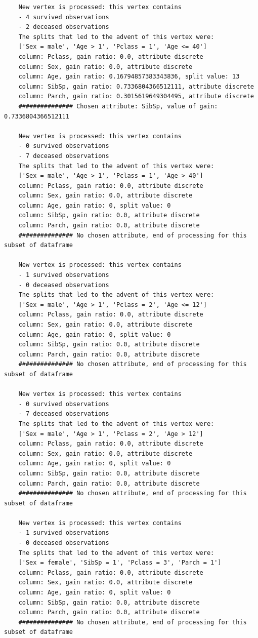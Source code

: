 \documentclass[12pt]{article}
\begin{document}
\begin{verbatim}
	New vertex is processed: this vertex contains
	- 4 survived observations
	- 2 deceased observations
	The splits that led to the advent of this vertex were:
	['Sex = male', 'Age > 1', 'Pclass = 1', 'Age <= 40']
	column: Pclass, gain ratio: 0.0, attribute discrete
	column: Sex, gain ratio: 0.0, attribute discrete
	column: Age, gain ratio: 0.16794857383343836, split value: 13
	column: SibSp, gain ratio: 0.7336804366512111, attribute discrete
	column: Parch, gain ratio: 0.3015619649304495, attribute discrete
	############### Chosen attribute: SibSp, value of gain: 0.7336804366512111
	
	New vertex is processed: this vertex contains
	- 0 survived observations
	- 7 deceased observations
	The splits that led to the advent of this vertex were:
	['Sex = male', 'Age > 1', 'Pclass = 1', 'Age > 40']
	column: Pclass, gain ratio: 0.0, attribute discrete
	column: Sex, gain ratio: 0.0, attribute discrete
	column: Age, gain ratio: 0, split value: 0
	column: SibSp, gain ratio: 0.0, attribute discrete
	column: Parch, gain ratio: 0.0, attribute discrete
	############### No chosen attribute, end of processing for this subset of dataframe
	
	New vertex is processed: this vertex contains
	- 1 survived observations
	- 0 deceased observations
	The splits that led to the advent of this vertex were:
	['Sex = male', 'Age > 1', 'Pclass = 2', 'Age <= 12']
	column: Pclass, gain ratio: 0.0, attribute discrete
	column: Sex, gain ratio: 0.0, attribute discrete
	column: Age, gain ratio: 0, split value: 0
	column: SibSp, gain ratio: 0.0, attribute discrete
	column: Parch, gain ratio: 0.0, attribute discrete
	############### No chosen attribute, end of processing for this subset of dataframe
	
	New vertex is processed: this vertex contains
	- 0 survived observations
	- 7 deceased observations
	The splits that led to the advent of this vertex were:
	['Sex = male', 'Age > 1', 'Pclass = 2', 'Age > 12']
	column: Pclass, gain ratio: 0.0, attribute discrete
	column: Sex, gain ratio: 0.0, attribute discrete
	column: Age, gain ratio: 0, split value: 0
	column: SibSp, gain ratio: 0.0, attribute discrete
	column: Parch, gain ratio: 0.0, attribute discrete
	############### No chosen attribute, end of processing for this subset of dataframe
	
	New vertex is processed: this vertex contains
	- 1 survived observations
	- 0 deceased observations
	The splits that led to the advent of this vertex were:
	['Sex = female', 'SibSp = 1', 'Pclass = 3', 'Parch = 1']
	column: Pclass, gain ratio: 0.0, attribute discrete
	column: Sex, gain ratio: 0.0, attribute discrete
	column: Age, gain ratio: 0, split value: 0
	column: SibSp, gain ratio: 0.0, attribute discrete
	column: Parch, gain ratio: 0.0, attribute discrete
	############### No chosen attribute, end of processing for this subset of dataframe
	

\end{verbatim}
\end{document}
